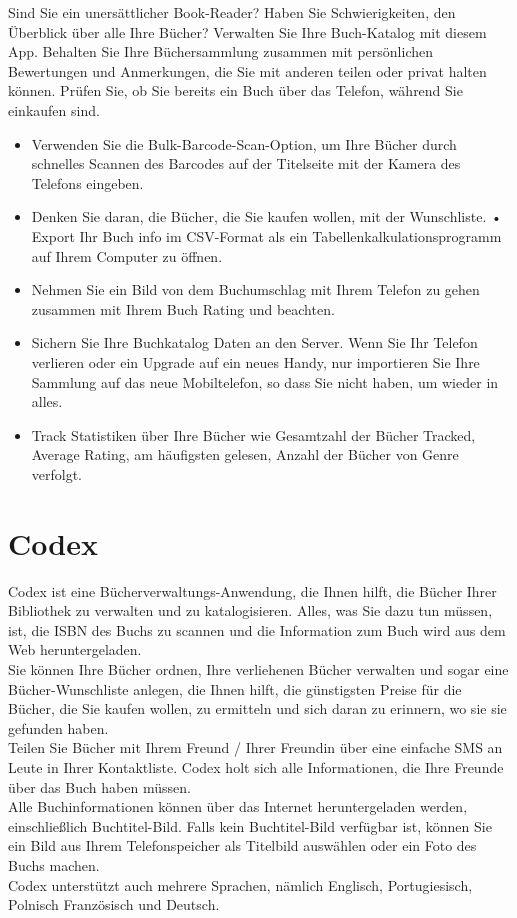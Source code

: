 Sind Sie ein unersättlicher Book-Reader? Haben Sie Schwierigkeiten, den Überblick über alle Ihre Bücher? Verwalten Sie Ihre Buch-Katalog mit diesem App. Behalten Sie Ihre Büchersammlung zusammen mit persönlichen Bewertungen und Anmerkungen, die Sie mit anderen teilen oder privat halten können. Prüfen Sie, ob Sie bereits ein Buch über das Telefon, während Sie einkaufen sind.\cite{MBP} \\

\begin{itemize}
	\item Verwenden Sie die Bulk-Barcode-Scan-Option, um Ihre Bücher durch schnelles Scannen des Barcodes auf der Titelseite mit der Kamera des Telefons eingeben.
	\item Denken Sie daran, die Bücher, die Sie kaufen wollen, mit der Wunschliste. • Export Ihr Buch info im CSV-Format als ein Tabellenkalkulationsprogramm auf Ihrem Computer zu öffnen.
	\item Nehmen Sie ein Bild von dem Buchumschlag mit Ihrem Telefon zu gehen zusammen mit Ihrem Buch Rating und beachten.
	\item Sichern Sie Ihre Buchkatalog Daten an den Server. Wenn Sie Ihr Telefon verlieren oder ein Upgrade auf ein neues Handy, nur importieren Sie Ihre Sammlung auf das neue Mobiltelefon, so dass Sie nicht haben, um wieder in alles.
	\item Track Statistiken über Ihre Bücher wie Gesamtzahl der Bücher Tracked, Average Rating, am häufigsten gelesen, Anzahl der Bücher von Genre verfolgt.
\end{itemize}

\section{Codex}

Codex ist eine Bücherverwaltungs-Anwendung, die Ihnen hilft, die Bücher Ihrer Bibliothek zu verwalten und zu katalogisieren. Alles, was Sie dazu tun müssen, ist, die ISBN des Buchs zu scannen und die Information zum Buch wird aus dem Web heruntergeladen.\\
Sie können Ihre Bücher ordnen, Ihre verliehenen Bücher verwalten und sogar eine Bücher-Wunschliste anlegen, die Ihnen hilft, die günstigsten Preise für die Bücher, die Sie kaufen wollen, zu ermitteln und sich daran zu erinnern, wo sie sie gefunden haben.\\
Teilen Sie Bücher mit Ihrem Freund / Ihrer Freundin über eine einfache SMS an Leute in Ihrer Kontaktliste. Codex holt sich alle Informationen, die Ihre Freunde über das Buch haben müssen.\\
Alle Buchinformationen können über das Internet heruntergeladen werden, einschließlich Buchtitel-Bild. Falls kein Buchtitel-Bild verfügbar ist, können Sie ein Bild aus Ihrem Telefonspeicher als Titelbild auswählen oder ein Foto des Buchs machen.\\
Codex unterstützt auch mehrere Sprachen, nämlich Englisch, Portugiesisch, Polnisch Französisch und Deutsch.\\

